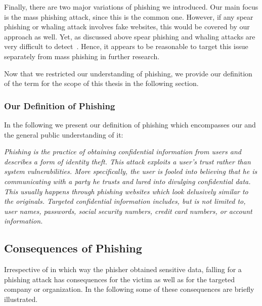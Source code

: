   Finally, there are two major variations of phishing we introduced.
 Our main focus is the mass phishing attack, since this is the common one.
 However, if any spear phishing or whaling attack involves fake websites, this would be covered by our approach as well.
Yet, as discussed above spear phishing and whaling attacks are very difficult to detect~\cite{trendlabs2012spear,statephishinghong}.
Hence, it appears to be reasonable to target this issue separately from mass phishing in further research.

Now that we restricted our understanding of phishing, we provide our definition of the term for the scope of this thesis in the following section.

\subsubsection{Our Definition of Phishing}
In the following we present our definition of phishing which encompasses our and the general public understanding of it:

\begin{center}
\textit{Phishing is the practice of obtaining confidential information from users and describes a form of identity theft. This attack exploits a user's trust rather than system vulnerabilities. More specifically, the user is fooled into believing that he is communicating with a party he trusts and lured into divulging confidential data. This usually happens through phishing websites which look delusively similar to the originals. Targeted confidential information includes, but is not limited to, user names, passwords, social security numbers, credit card numbers, or account information.}~\cite{jakobsson2006phishing}
\end{center}

\subsection{Consequences of Phishing}
Irrespective of in which way the phisher obtained sensitive data, falling for a phishing attack has consequences for the victim as well as for the targeted company or organization.
In the following some of these consequences are briefly illustrated.

